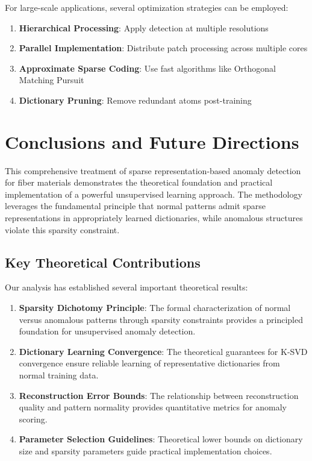 \documentclass[12pt]{article}
\begin{document}
For large-scale applications, several optimization strategies can be employed:

\begin{enumerate}[leftmargin=*]
    \item \textbf{Hierarchical Processing}: Apply detection at multiple resolutions
    \item \textbf{Parallel Implementation}: Distribute patch processing across multiple cores
    \item \textbf{Approximate Sparse Coding}: Use fast algorithms like Orthogonal Matching Pursuit
    \item \textbf{Dictionary Pruning}: Remove redundant atoms post-training
\end{enumerate}

\newpage

\section{Conclusions and Future Directions}
\label{sec:conclusions}

This comprehensive treatment of sparse representation-based anomaly detection for fiber materials demonstrates the theoretical foundation and practical implementation of a powerful unsupervised learning approach. The methodology leverages the fundamental principle that normal patterns admit sparse representations in appropriately learned dictionaries, while anomalous structures violate this sparsity constraint.

\subsection{Key Theoretical Contributions}
\label{subsec:theoretical_contributions}

Our analysis has established several important theoretical results:

\begin{enumerate}[leftmargin=*]
    \item \textbf{Sparsity Dichotomy Principle}: The formal characterization of normal versus anomalous patterns through sparsity constraints provides a principled foundation for unsupervised anomaly detection.

    \item \textbf{Dictionary Learning Convergence}: The theoretical guarantees for K-SVD convergence ensure reliable learning of representative dictionaries from normal training data.

    \item \textbf{Reconstruction Error Bounds}: The relationship between reconstruction quality and pattern normality provides quantitative metrics for anomaly scoring.

    \item \textbf{Parameter Selection Guidelines}: Theoretical lower bounds on dictionary size and sparsity parameters guide practical implementation choices.
\end{enumerate}
\end{document}
